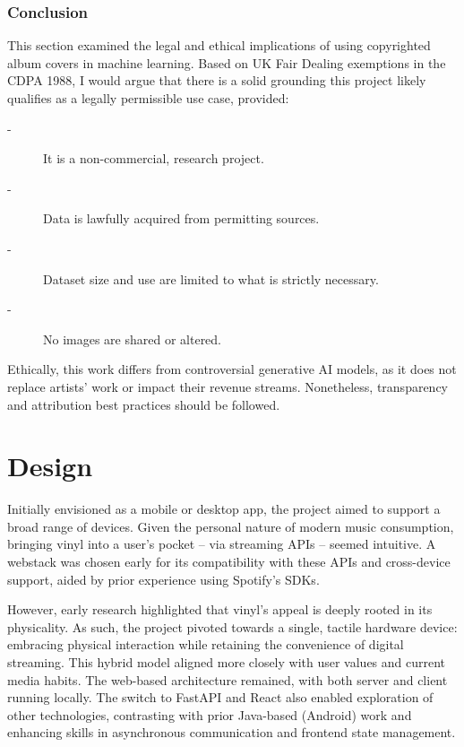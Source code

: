               \subsubsection{Conclusion}
    
                  This section examined the legal and ethical implications of using copyrighted album covers in machine learning. Based on UK Fair Dealing exemptions in the CDPA 1988, I would argue that there is a solid grounding this project likely qualifies as a legally permissible use case, provided:
                  \begin{description}
                      \item[-] It is a non-commercial, research project.
                      \item[-] Data is lawfully acquired from permitting sources.
                      \item[-] Dataset size and use are limited to what is strictly necessary.
                      \item[-] No images are shared or altered. %
                  \end{description}
                  
                  Ethically, this work differs from controversial generative AI models, as it does not replace artists’ work or impact their revenue streams. Nonetheless, transparency and attribution best practices should be followed.
    
    \section{Design} %
    
        Initially envisioned as a mobile or desktop app, the project aimed to support a broad range of devices. Given the personal nature of modern music consumption, bringing vinyl into a user’s pocket -- via streaming APIs -- seemed intuitive. A webstack was chosen early for its compatibility with these APIs and cross-device support, aided by prior experience using Spotify’s SDKs.
    
        However, early research highlighted that vinyl’s appeal is deeply rooted in its physicality. As such, the project pivoted towards a single, tactile hardware device: embracing physical interaction while retaining the convenience of digital streaming. This hybrid model aligned more closely with user values and current media habits. The web-based architecture remained, with both server and client running locally. The switch to FastAPI and React also enabled exploration of other technologies, contrasting with prior Java-based (Android) work and enhancing skills in asynchronous communication and frontend state management.
    
